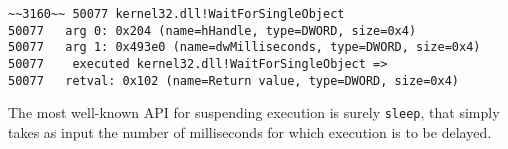 \vspace{0.5cm}
\begin{lstlisting}[caption={Log entry relative to \texttt{WaitForSingleObject}},captionpos=b]
~~3160~~ 50077 kernel32.dll!WaitForSingleObject
50077 	arg 0: 0x204 (name=hHandle, type=DWORD, size=0x4)
50077 	arg 1: 0x493e0 (name=dwMilliseconds, type=DWORD, size=0x4)
50077    executed kernel32.dll!WaitForSingleObject =>
50077 	retval: 0x102 (name=Return value, type=DWORD, size=0x4)
\end{lstlisting}

The most well-known API for suspending execution is surely \texttt{sleep}, that simply takes as input the number of milliseconds for which execution is to be delayed.

